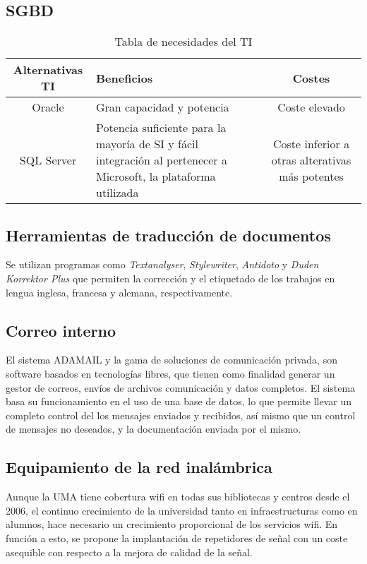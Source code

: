 \documentclass[11pt,a4paper,spanish,twoside]{book}
\begin{document}
\begin{itemize}
\subsection{SGBD}

\begin{table}[!h]
\centering
  \begin{tabular}{clc}
    \textbf{Alternativas TI} & \textbf{Beneficios} &
    \textbf{Costes} \\ \hline 
    \hline \hline
    Oracle & Gran capacidad y potencia & Coste elevado\\
    SQL Server & Potencia suficiente para la mayoría de SI y fácil
    integración al pertenecer a Microsoft, la plataforma utilizada & Coste
    inferior a otras alterativas más potentes\\
  \end{tabular}
\caption{Tabla de necesidades del TI}
\end{table}

\subsection{Herramientas de traducción de documentos}
Se utilizan programas como \emph{Textanalyser}, \emph{Stylewriter},
\emph{Antidoto} y \emph{Duden Korrektor Plus} que permiten la corrección y el
etiquetado de los trabajos en lengua inglesa, francesa y alemana,
respectivamente. 

\subsection{Correo interno}
El sistema ADAMAIL y la gama de soluciones de comunicación privada, son
software basados en tecnologías libres, que tienen como finalidad generar un
gestor de correos, envíos de archivos comunicación y datos completos. El
sistema basa su funcionamiento en el uso de una base de datos, lo que permite
llevar un completo control del los mensajes enviados y recibidos, así mismo
que un control de mensajes no deseados, y la documentación enviada por el
mismo.

\subsection{Equipamiento de la red inalámbrica}
Aunque la UMA tiene cobertura wifi en todas sus bibliotecas y centros desde
el 2006, el continuo crecimiento de la universidad tanto en infraestructuras
como en alumnos, hace necesario un crecimiento proporcional de los servicios
wifi. En función a esto, se propone la implantación de repetidores de señal
con un coste asequible con respecto a la mejora de calidad de la señal.



\end{itemize}
\end{document}
